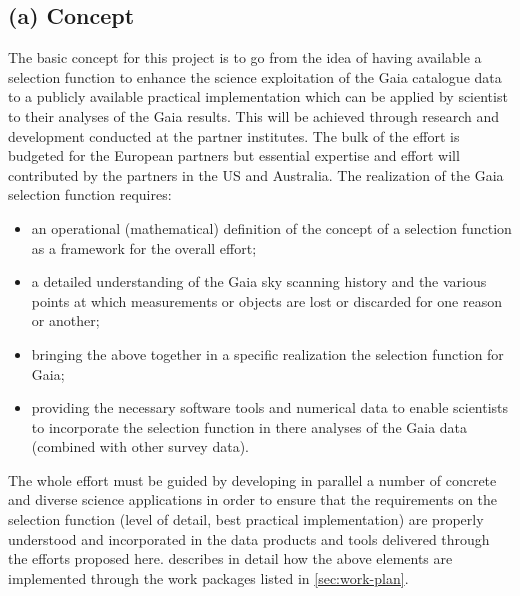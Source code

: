 \subsection{(a) Concept}
\label{sec:concept}

The basic concept for this project is to go from the idea of having available a selection function to enhance the science exploitation of the Gaia catalogue data to a publicly available practical implementation which can be applied by scientist to their analyses of the Gaia results. This will be achieved through research and development conducted at the partner institutes. The bulk of the effort is budgeted for the European partners but essential expertise and effort will contributed by the partners in the US and Australia. The realization of the Gaia selection function requires: 
\begin{itemize}
    \item an operational (mathematical) definition of the concept of a selection function as a framework for the overall effort;
    \item a detailed understanding of the Gaia sky scanning history and the various points at which measurements or objects are lost or discarded for one reason or another;
    \item bringing the above together in a specific realization the selection function for Gaia;
    \item providing the necessary software tools and numerical data to enable scientists to incorporate the selection function in there analyses of the Gaia data (combined with other survey data).
\end{itemize}
The whole effort must be guided by developing in parallel a number of concrete and diverse science applications in order to ensure that the requirements on the selection function (level of detail, best practical implementation) are properly understood and incorporated in the data products and tools delivered through the efforts proposed here.  describes in detail how the above elements are implemented through the work packages listed in \ref{sec:work-plan}.

